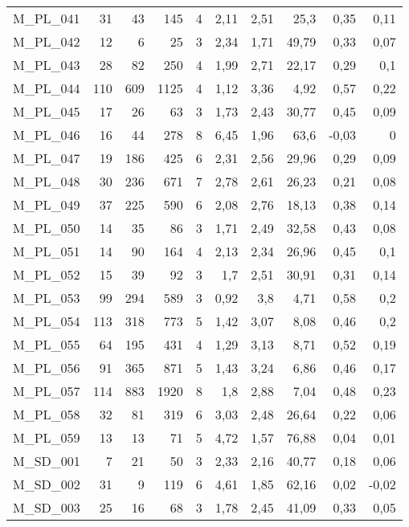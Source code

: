 \documentclass{article}
\begin{document}
\begin{table}[htbp]
\begin{tabular}{lrrrrrrrrr}
    M\_PL\_041 & 31   & 43   & 145  & 4    & 2,11 & 2,51 & 25,3 & 0,35 & 0,11 \\
    M\_PL\_042 & 12   & 6    & 25   & 3    & 2,34 & 1,71 & 49,79 & 0,33 & 0,07 \\
    M\_PL\_043 & 28   & 82   & 250  & 4    & 1,99 & 2,71 & 22,17 & 0,29 & 0,1 \\
    M\_PL\_044 & 110  & 609  & 1125 & 4    & 1,12 & 3,36 & 4,92 & 0,57 & 0,22 \\
    M\_PL\_045 & 17   & 26   & 63   & 3    & 1,73 & 2,43 & 30,77 & 0,45 & 0,09 \\
    M\_PL\_046 & 16   & 44   & 278  & 8    & 6,45 & 1,96 & 63,6 & -0,03 & 0 \\
    M\_PL\_047 & 19   & 186  & 425  & 6    & 2,31 & 2,56 & 29,96 & 0,29 & 0,09 \\
    M\_PL\_048 & 30   & 236  & 671  & 7    & 2,78 & 2,61 & 26,23 & 0,21 & 0,08 \\
    M\_PL\_049 & 37   & 225  & 590  & 6    & 2,08 & 2,76 & 18,13 & 0,38 & 0,14 \\
    M\_PL\_050 & 14   & 35   & 86   & 3    & 1,71 & 2,49 & 32,58 & 0,43 & 0,08 \\
    M\_PL\_051 & 14   & 90   & 164  & 4    & 2,13 & 2,34 & 26,96 & 0,45 & 0,1 \\
    M\_PL\_052 & 15   & 39   & 92   & 3    & 1,7  & 2,51 & 30,91 & 0,31 & 0,14 \\
    M\_PL\_053 & 99   & 294  & 589  & 3    & 0,92 & 3,8  & 4,71 & 0,58 & 0,2 \\
    M\_PL\_054 & 113  & 318  & 773  & 5    & 1,42 & 3,07 & 8,08 & 0,46 & 0,2 \\
    M\_PL\_055 & 64   & 195  & 431  & 4    & 1,29 & 3,13 & 8,71 & 0,52 & 0,19 \\
    M\_PL\_056 & 91   & 365  & 871  & 5    & 1,43 & 3,24 & 6,86 & 0,46 & 0,17 \\
    M\_PL\_057 & 114  & 883  & 1920 & 8    & 1,8  & 2,88 & 7,04 & 0,48 & 0,23 \\
    M\_PL\_058 & 32   & 81   & 319  & 6    & 3,03 & 2,48 & 26,64 & 0,22 & 0,06 \\
    M\_PL\_059 & 13   & 13   & 71   & 5    & 4,72 & 1,57 & 76,88 & 0,04 & 0,01 \\
    M\_SD\_001 & 7    & 21   & 50   & 3    & 2,33 & 2,16 & 40,77 & 0,18 & 0,06 \\
    M\_SD\_002 & 31   & 9    & 119  & 6    & 4,61 & 1,85 & 62,16 & 0,02 & -0,02 \\
    M\_SD\_003 & 25   & 16   & 68   & 3    & 1,78 & 2,45 & 41,09 & 0,33 & 0,05 \\

\end{tabular}
\end{table}
\end{document}
